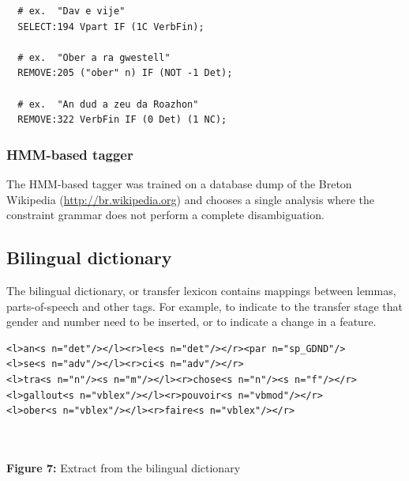 \documentclass[a0,landscape]{a0poster}
\begin{document}
\begin{multicols}{4}
\begin{small}
\begin{verbatim}
  # ex.  "Dav e vije"
  SELECT:194 Vpart IF (1C VerbFin);

  # ex.  "Ober a ra gwestell"
  REMOVE:205 ("ober" n) IF (NOT -1 Det);

  # ex.  "An dud a zeu da Roazhon"
  REMOVE:322 VerbFin IF (0 Det) (1 NC);
\end{verbatim}
\end{small}

\subsubsection{HMM-based tagger}

\noindent
The HMM-based tagger was trained on a database dump of the Breton Wikipedia (\url{http://br.wikipedia.org}) and
chooses a single analysis where the constraint grammar does not perform a complete disambiguation.\\

\subsection{Bilingual dictionary}

\noindent
The bilingual dictionary, or transfer lexicon contains mappings between lemmas,
parts-of-speech and other tags. For example, to indicate to the transfer stage
that gender and number need to be inserted, or to indicate a change in a feature.\\

\begin{center}
\begin{minipage}[b]{26cm}
\begin{small}
\begin{verbatim}
<l>an<s n="det"/></l><r>le<s n="det"/></r><par n="sp_GDND"/>
<l>se<s n="adv"/></l><r>ci<s n="adv"/></r>
<l>tra<s n="n"/><s n="m"/></l><r>chose<s n="n"/><s n="f"/></r>
<l>gallout<s n="vblex"/></l><r>pouvoir<s n="vbmod"/></r>
<l>ober<s n="vblex"/></l><r>faire<s n="vblex"/></r>
\end{verbatim}
\end{small}
\end{minipage}\\
~\\
\textbf{Figure 7:} Extract from the bilingual dictionary
\vspace{0.3cm}
\end{center}


\end{multicols}
\end{document}
